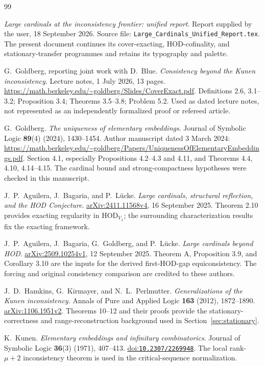 \documentclass[11pt,letterpaper]{article}
\theoremstyle{definition}
\newcommand{\HOD}{\mathrm{HOD}}
\newcommand{\arxiv}[1]{\href{https://arxiv.org/abs/#1}{arXiv:#1}}
\newcommand{\doi}[1]{\href{https://doi.org/#1}{doi:\nolinkurl{#1}}}
\theoremstyle{remark}
\begin{document}
\clearpage
{}
{}
\begin{thebibliography}{99}
\small
\setlength{\itemsep}{7pt}
\setlength{\parskip}{1pt}

\emph{Large cardinals at the inconsistency frontier: unified report}.
Report supplied by the user, 18 September 2026.
Source file: \nolinkurl{Large_Cardinals_Unified_Report.tex}.
The present document continues its cover-exacting, HOD-cofinality, and stationary-transfer programmes and retains its typography and palette.

G.~Goldberg, reporting joint work with D.~Blue.
\emph{Consistency beyond the Kunen inconsistency}.
Lecture notes, 1 July 2026, 13 pages.
\url{https://math.berkeley.edu/~goldberg/Slides/CoverExact.pdf}.
Definitions 2.6, 3.1--3.2; Proposition 3.4; Theorems 3.5--3.8; Problem 5.2.
Used as dated lecture notes, not represented as an independently formalized proof or refereed article.

G.~Goldberg. \emph{The uniqueness of elementary embeddings}.
Journal of Symbolic Logic \textbf{89}(4) (2024), 1430--1454.
Author manuscript dated 3 March 2024:
\url{https://math.berkeley.edu/~goldberg/Papers/UniquenessOfElementaryEmbeddings.pdf}.
Section 4.1, especially Propositions 4.2--4.3 and 4.11, and Theorems 4.4, 4.10, 4.14--4.15.
The cardinal bound and strong-compactness hypotheses were checked in this manuscript.

J.~P.~Aguilera, J.~Bagaria, and P.~L\"ucke.
\emph{Large cardinals, structural reflection, and the HOD Conjecture}.
\arxiv{2411.11568v4}, 16 September 2025.
Theorem 2.10 provides exacting regularity in $\HOD_{V_\lambda}$; the surrounding characterization results fix the exacting framework.

J.~P.~Aguilera, J.~Bagaria, G.~Goldberg, and P.~L\"ucke.
\emph{Large cardinals beyond HOD}.
\arxiv{2509.10254v1}, 12 September 2025.
Theorem A, Proposition 3.9, and Corollary 3.10 are the inputs for the derived first-HOD-gap equiconsistency. The forcing and original consistency comparison are credited to these authors.

J.~D.~Hamkins, G.~Kirmayer, and N.~L.~Perlmutter.
\emph{Generalizations of the Kunen inconsistency}.
Annals of Pure and Applied Logic \textbf{163} (2012), 1872--1890.
\arxiv{1106.1951v2}.
Theorems 10--12 and their proofs provide the stationary-correctness and range-reconstruction background used in Section~\ref{sec:stationary}.

K.~Kunen. \emph{Elementary embeddings and infinitary combinatorics}.
Journal of Symbolic Logic \textbf{36}(3) (1971), 407--413.
\doi{10.2307/2269948}.
The local rank-$\mu+2$ inconsistency theorem is used in the critical-sequence normalization.

\end{thebibliography}
\end{document}
